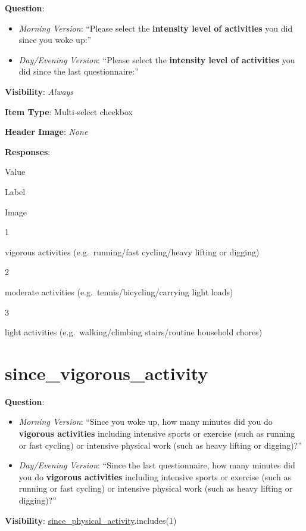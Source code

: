 \documentclass[]{book}
\providecommand{\tightlist}{%
  \setlength{\itemsep}{0pt}\setlength{\parskip}{0pt}}
\begin{document}
\textbf{Question}:

\begin{itemize}
\tightlist
\item
  \emph{Morning Version}: ``Please select the \textbf{intensity level of activities} you did since you woke up:''
\item
  \emph{Day/Evening Version}: ``Please select the \textbf{intensity level of activities} you did since the last questionnaire:''
\end{itemize}

\textbf{Visibility}: \emph{Always}

\textbf{Item Type}: Multi-select checkbox

\textbf{Header Image}: \emph{None}

\textbf{Responses}:

Value

Label

Image

1

vigorous activities (e.g.~running/fast cycling/heavy lifting or digging)

2

moderate activities (e.g.~tennis/bicycling/carrying light loads)

3

light activities (e.g.~walking/climbing stairs/routine household chores)

\hypertarget{since_vigorous_activity}{%
\section{since\_vigorous\_activity}\label{since_vigorous_activity}}

\textbf{Question}:

\begin{itemize}
\tightlist
\item
  \emph{Morning Version}: ``Since you woke up, how many minutes did you do \textbf{vigorous activities} including intensive sports or exercise (such as running or fast cycling) or intensive physical work (such as heavy lifting or digging)?''
\item
  \emph{Day/Evening Version}: ``Since the last questionnaire, how many minutes did you do \textbf{vigorous activities} including intensive sports or exercise (such as running or fast cycling) or intensive physical work (such as heavy lifting or digging)?''
\end{itemize}

\textbf{Visibility}: \protect\hyperlink{since_physical_activity}{since\_physical\_activity}.includes(1)
\end{document}
